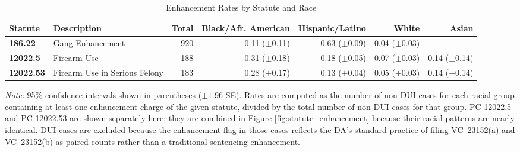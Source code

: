 \begin{table}
\caption{Enhancement Rates by Statute and Race}
\label{tab:enhancement_by_statute}
\small
\begin{tabular}{p{1.5cm}p{4cm}rrrrr}
\toprule
Statute & Description & Total & Black/Afr. American & Hispanic/Latino & White & Asian \\
\midrule
\textbf{186.22} & Gang Enhancement & 920 & 0.11 ({\scriptsize $\pm$0.11}) & 0.63 ({\scriptsize $\pm$0.09}) & 0.04 ({\scriptsize $\pm$0.03}) & --- \\
\textbf{12022.5} & Firearm Use & 188 & 0.31 ({\scriptsize $\pm$0.18}) & 0.18 ({\scriptsize $\pm$0.05}) & 0.07 ({\scriptsize $\pm$0.03}) & 0.14 ({\scriptsize $\pm$0.14}) \\
\textbf{12022.53} & Firearm Use in Serious Felony & 183 & 0.28 ({\scriptsize $\pm$0.17}) & 0.13 ({\scriptsize $\pm$0.04}) & 0.05 ({\scriptsize $\pm$0.03}) & 0.14 ({\scriptsize $\pm$0.14}) \\
\bottomrule
\end{tabular}
\smallskip
\parbox{\textwidth}{\footnotesize \textit{Note:} 95\% confidence intervals shown in parentheses ($\pm 1.96$ SE). Rates are computed as the number of non-DUI cases for each racial group containing at least one enhancement charge of the given statute, divided by the total number of non-DUI cases for that group. PC 12022.5 and PC 12022.53 are shown separately here; they are combined in Figure \ref{fig:statute_enhancement} because their racial patterns are nearly identical. DUI cases are excluded because the enhancement flag in those cases reflects the DA's standard practice of filing VC~23152(a) and VC~23152(b) as paired counts rather than a traditional sentencing enhancement.}
\end{table}
